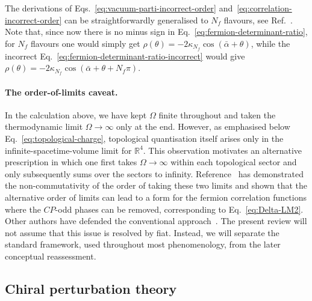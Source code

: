 \documentclass[review]{elsarticle}
\numberwithin{equation}{section}
\numberwithin{table}{section}
\numberwithin{figure}{section}
\begin{document}
The derivations of Eqs.~\eqref{eq:vacuum-parti-incorrect-order} and~\eqref{eq:correlation-incorrect-order} can be straightforwardly generalised to $N_f$ flavours, see Ref.~\cite{Ai:2020ptm}. Note that, since now there is no minus sign in Eq.~\eqref{eq:fermion-determinant-ratio}, for $N_f$ flavours one would simply get $\rho(\theta)=-2\kappa_{N_f}\cos(\bar\alpha+\theta)$, while the incorrect Eq.~\eqref{eq:fermion-determinant-ratio-incorrect} would give $\rho(\theta)=-2\kappa_{N_f}\cos(\bar\alpha+\theta+N_f\pi)$.

\paragraph{The order-of-limits caveat.}
In the calculation above, we have kept $\Omega$ finite throughout and taken the thermodynamic limit $\Omega\to\infty$ only at the end. However, as emphasised below Eq.~\eqref{eq:topological-charge}, topological quantisation itself arises only in the infinite-spacetime-volume limit for $\mathbb{R}^4$. This observation motivates an alternative prescription in which one first takes $\Omega\to\infty$ within each topological sector and only subsequently sums over the sectors to infinity. Reference~\cite{Ai:2020ptm} has demonstrated the non-commutativity of the order of taking these two limits and shown that the alternative order of limits can lead to a form for the fermion correlation functions where the $CP$-odd phases can be removed, corresponding to Eq.~\eqref{eq:Delta-LM2}.  Other authors have defended the conventional approach~\cite{Benabou:2025viy,Bhattacharya:2025qsk,Khoze:2025auv,Aghaie:2026pkf}. The present review will not assume that this issue is resolved by fiat. Instead, we will separate the standard framework, used throughout most phenomenology, from the later conceptual reassessment.

\subsection{Chiral perturbation theory}
\label{sec:chiral-perturbation-theory}
\end{document}
